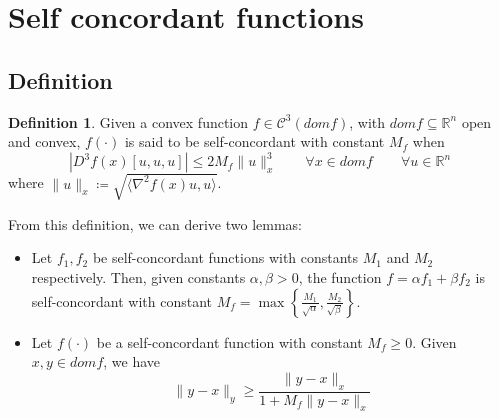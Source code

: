 \documentclass[12pt, openany]{report}
\newcommand{\R}{\mathbb{R}}
\theoremstyle{definition}
\newtheorem{definition}[thm]{Definition}
\begin{document}
\section{Self concordant functions}
\subsection{Definition}
\begin{definition}
	Given a convex function $f\in \mathcal{C}^3 (dom f)$, with $domf\subseteq \R^n$ open and convex, $f(\cdot)$ is said to be self-concordant with constant $M_f$ when 
	\begin{equation}
		\left| D^3 f(x)[u,u,u] \right| \le 2M_f \|u\|_x^3 \qquad \forall x\in domf \qquad \forall u\in \R^n
	\end{equation}
	where $\|u\|_x \coloneqq \sqrt{\langle \nabla^2 f(x)u,u\rangle}$.
\end{definition}
From this definition, we can derive two lemmas:
\begin{itemize}
	\item Let $f_1,f_2$ be self-concordant functions with constants $M_1$ and $M_2$ respectively. Then, given constants $\alpha,\beta>0$, the function $f=\alpha f_1 + \beta f_2$ is self-concordant with constant $M_f = \max\left\{\frac{M_1}{\sqrt{\alpha}}, \frac{M_2}{\sqrt{\beta}}\right\}$.
	\item Let $f(\cdot)$ be a self-concordant function with constant $M_f\ge 0$. Given $x,y\in domf$, we have 
	\begin{equation}
		\|y-x\|_y \ge \frac{\|y-x\|_x}{1+M_f \|y-x\|_x}
	\end{equation}
\end{itemize}
\end{document}
